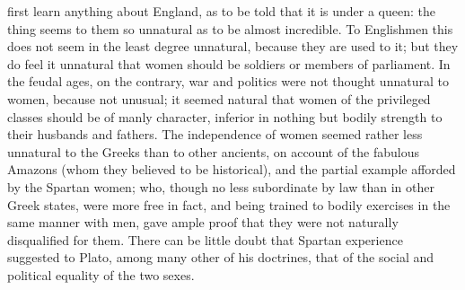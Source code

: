 \documentclass[12pt]{report}
\begin{document}
first learn anything about England, as to be told that it is under a queen: the thing seems to them so unnatural as to be almost incredible. To Englishmen this does not seem in the least degree unnatural, because they are used to it; but they do feel it unnatural that women should be soldiers or members of parliament. In the feudal ages, on the contrary, war and politics were not thought unnatural to women, because not unusual; it seemed natural that women of the privileged classes should be of manly character, inferior in nothing but bodily strength to their husbands and fathers. The independence of women seemed rather less unnatural to the Greeks than to other ancients, on account of the fabulous Amazons (whom they believed to be historical), and the partial example afforded by the Spartan women; who, though no less subordinate by law than in other Greek states, were more free in fact, and being trained to bodily exercises in the same manner with men, gave ample proof that they were not naturally disqualified for them. There can be little doubt that Spartan experience suggested to Plato, among many other of his doctrines, that of the social and political equality of the two sexes.
\clearpage
\end{document}

